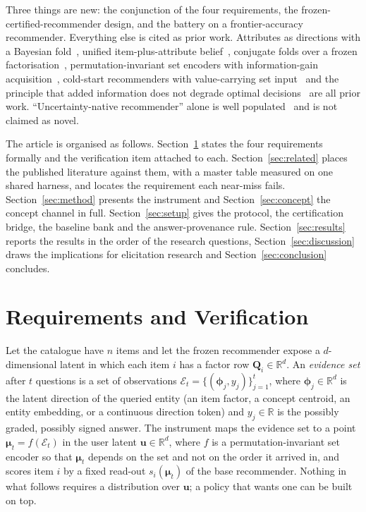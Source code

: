\documentclass[manuscript,screen,review]{acmart}
\newcommand{\R}{\mathbb{R}}
\newcommand{\Q}{\mathbf{Q}}
\newcommand{\uu}{\mathbf{u}}
\newcommand{\bphi}{\boldsymbol{\phi}}
\newcommand{\bmu}{\boldsymbol{\mu}}
\begin{document}
Three things are new: the conjunction of the four requirements, the frozen-certified-recommender design, and the battery on a frontier-accuracy recommender. Everything else is cited as prior work. Attributes as directions with a Bayesian fold~\citep{biyik2023soft}, unified item-plus-attribute belief~\citep{li2021seamlessly}, conjugate folds over a frozen factorisation~\citep{toroghi2023bcie}, permutation-invariant set encoders with information-gain acquisition~\citep{ma2019eddi}, cold-start recommenders with value-carrying set input~\citep{lin2021tanp} and the principle that added information does not degrade optimal decisions~\citep{good1967principle,blackwell1953equivalent} are all prior work. ``Uncertainty-native recommender'' alone is well populated~\citep{wang2025bdecf} and is not claimed as novel.

The article is organised as follows. Section~\ref{sec:reqs} states the four requirements formally and the verification item attached to each. Section~\ref{sec:related} places the published literature against them, with a master table measured on one shared harness, and locates the requirement each near-miss fails. Section~\ref{sec:method} presents the instrument and Section~\ref{sec:concept} the concept channel in full. Section~\ref{sec:setup} gives the protocol, the certification bridge, the baseline bank and the answer-provenance rule. Section~\ref{sec:results} reports the results in the order of the research questions, Section~\ref{sec:discussion} draws the implications for elicitation research and Section~\ref{sec:conclusion} concludes.

\section{Requirements and Verification}\label{sec:reqs}

Let the catalogue have $n$ items and let the frozen recommender expose a $d$-dimensional latent in which each item $i$ has a factor row $\Q_i\in\R^{d}$. An \emph{evidence set} after $t$ questions is a set of observations $\mathcal E_t=\{(\bphi_j, y_j)\}_{j=1}^{t}$, where $\bphi_j\in\R^{d}$ is the latent direction of the queried entity (an item factor, a concept centroid, an entity embedding, or a continuous direction token) and $y_j\in\R$ is the possibly graded, possibly signed answer. The instrument maps the evidence set to a point $\bmu_t = f(\mathcal E_t)$ in the user latent $\uu\in\R^{d}$, where $f$ is a permutation-invariant set encoder so that $\bmu_t$ depends on the set and not on the order it arrived in, and scores item $i$ by a fixed read-out $s_i(\bmu_t)$ of the base recommender. Nothing in what follows requires a distribution over $\uu$; a policy that wants one can be built on top.
\end{document}
